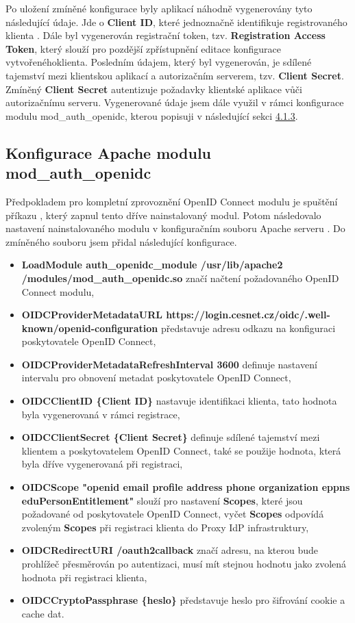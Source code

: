 \documentclass[
  printed, %
  twoside, %
  table,   %
  nolof,     %
  nolot,     %
]{fithesis3}
\begin{document}
Po uložení zmíněné konfigurace byly aplikací náhodně vygenerovány tyto následující údaje. Jde o \textbf{Client ID}, které jednoznačně identifikuje registrovaného klienta . Dále byl vygenerován registrační token, tzv. \textbf{Registration Access Token}, který slouží pro pozdější zpřístupnění editace konfigurace vytvořeného\break klienta. Posledním údajem, který byl vygenerován, je sdílené tajemství mezi klientskou aplikací a autorizačním serverem, tzv. \textbf{Client Secret}. Zmíněný \textbf{Client Secret} autentizuje požadavky klientské aplikace vůči autorizačnímu serveru. Vygenerované údaje jsem dále využil v rámci konfigurace modulu mod\_auth\_openidc, kterou popisuji v následující sekci \hyperref[sec:mod-conf]{4.1.3}.

\subsection{Konfigurace Apache modulu mod\_auth\_openidc} 
\label{sec:mod-conf}
Předpokladem pro kompletní zprovoznění OpenID Connect modulu je spuštění příkazu , který zapnul tento dříve nainstalovaný modul. Potom následovalo nastavení nainstalovaného modulu v konfiguračním souboru Apache serveru . Do zmíněného souboru jsem přidal následující konfigurace.

\begin{itemize}
    \item \textbf{LoadModule auth\_openidc\_module /usr/lib/apache2\\ /modules/mod\_auth\_openidc.so} značí načtení požadovaného OpenID Connect modulu, 
    \item \textbf{OIDCProviderMetadataURL https://login.cesnet.cz/oidc/.well-known/openid-configuration} představuje adresu odkazu na konfiguraci poskytovatele OpenID Connect, 
    \item \textbf{OIDCProviderMetadataRefreshInterval 3600} definuje nastavení intervalu pro obnovení metadat poskytovatele OpenID Connect, 
    \item \textbf{OIDCClientID \{Client ID\}} nastavuje identifikaci klienta, tato hodnota byla vygenerovaná v rámci registrace,
    \item \textbf{OIDCClientSecret \{Client Secret\}} definuje sdílené tajemství mezi klientem a poskytovatelem OpenID Connect, také se použije hodnota, která byla dříve vygenerovaná při registraci,
    \item \textbf{OIDCScope "openid email profile address phone organization eppns eduPersonEntitlement"} slouží pro nastavení \textbf{Scopes}, které jsou požadované od poskytovatele OpenID Connect, vyčet \textbf{Scopes} odpovídá zvoleným \textbf{Scopes} při registraci klienta do Proxy IdP infrastruktury,
    \item \textbf{OIDCRedirectURI /oauth2callback} značí adresu, na kterou bude prohlížeč přesměrován po autentizaci, musí mít stejnou hodnotu jako zvolená hodnota při registraci klienta, 
    \item \textbf{OIDCCryptoPassphrase \{heslo\}} představuje heslo pro šifrování cookie a cache dat. 
\end{itemize}
\end{document}
